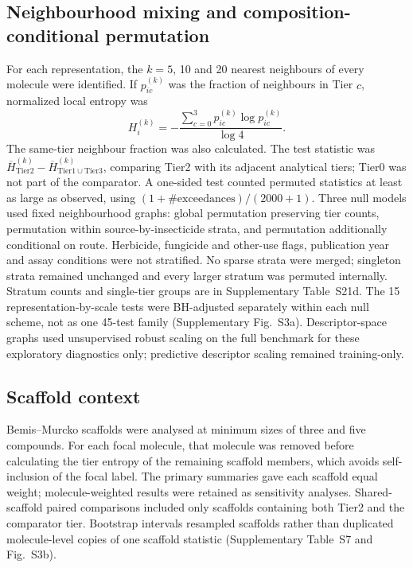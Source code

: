 \documentclass[10pt]{article}
\begin{document}
\subsection*{Neighbourhood mixing and composition-conditional permutation}
For each representation, the \(k=5\), 10 and 20 nearest neighbours of every molecule were identified. If \(p_{ic}^{(k)}\) was the fraction of neighbours in Tier \(c\), normalized local entropy was
\begin{equation}
H_i^{(k)}=-\frac{\sum_{c=0}^{3}p_{ic}^{(k)}\log p_{ic}^{(k)}}{\log4}.\label{eq:si-entropy}
\end{equation}
The same-tier neighbour fraction was also calculated. The test statistic was \(\overline H_{\mathrm{Tier2}}^{(k)}-\overline H_{\mathrm{Tier1}\cup\mathrm{Tier3}}^{(k)}\), comparing Tier2 with its adjacent analytical tiers; Tier0 was not part of the comparator. A one-sided test counted permuted statistics at least as large as observed, using \((1+\#\mathrm{exceedances})/(2000+1)\). Three null models used fixed neighbourhood graphs: global permutation preserving tier counts, permutation within source-by-insecticide strata, and permutation additionally conditional on route. Herbicide, fungicide and other-use flags, publication year and assay conditions were not stratified. No sparse strata were merged; singleton strata remained unchanged and every larger stratum was permuted internally. Stratum counts and single-tier groups are in Supplementary Table~S21d. The 15 representation-by-scale tests were BH-adjusted separately within each null scheme, not as one 45-test family (Supplementary Fig.~S3a). Descriptor-space graphs used unsupervised robust scaling on the full benchmark for these exploratory diagnostics only; predictive descriptor scaling remained training-only.

\subsection*{Scaffold context}
Bemis--Murcko scaffolds were analysed at minimum sizes of three and five compounds. For each focal molecule, that molecule was removed before calculating the tier entropy of the remaining scaffold members, which avoids self-inclusion of the focal label. The primary summaries gave each scaffold equal weight; molecule-weighted results were retained as sensitivity analyses. Shared-scaffold paired comparisons included only scaffolds containing both Tier2 and the comparator tier. Bootstrap intervals resampled scaffolds rather than duplicated molecule-level copies of one scaffold statistic (Supplementary Table~S7 and Fig.~S3b).
\end{document}
